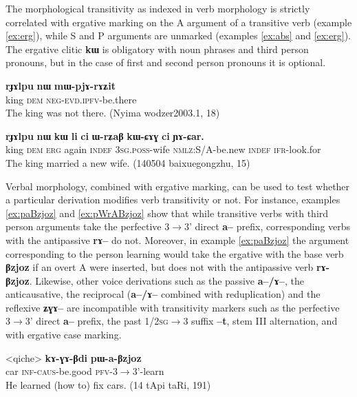 \documentclass[oldfontcommands,oneside,a4paper,11pt]{article}
\newcommand{\ipa}[1]{\textbf{{\phon\mbox{#1}}}} %
\begin{document}
The morphological transitivity as indexed in verb morphology is strictly correlated with ergative marking on the A argument of a transitive verb (example \ref{ex:erg}), while S and P arguments are unmarked (examples \ref{ex:abs} and \ref{ex:erg}). The ergative clitic \ipa{kɯ} is obligatory with noun phrases and third person pronouns, but in the case of first and second person pronouns it is optional.  

 \begin{exe}
\ex \label{ex:abs}
\gll
\ipa{rɟɤlpu}  	\ipa{nɯ}  	\ipa{mɯ-pjɤ-rɤʑit}  \\
king \textsc{dem} \textsc{neg-evd.ipfv}-be.there \\
 \glt The king was not there. (Nyima wodzer2003.1, 18)
\end{exe}

 \begin{exe}
\ex \label{ex:erg}
\gll 
\ipa{rɟɤlpu}  	\ipa{nɯ}  	\ipa{kɯ}  	\ipa{li}  	\ipa{ci}  	\ipa{ɯ-rʑaβ}  	\ipa{kɯ-ɕɤɣ}  	\ipa{ci}  	\ipa{ɲɤ-ɕar.}  	 \\
king \textsc{dem} \textsc{erg} again \textsc{indef} \textsc{3sg.poss}-wife \textsc{nmlz}:S/A-be.new \textsc{indef}  \textsc{ifr}-look.for \\
\glt The king married a new wife. (140504 baixuegongzhu, 15)
\end{exe}

Verbal morphology, combined with ergative marking, can be used to test whether a particular derivation modifies verb transitivity or not. For instance, examples \ref{ex:paBzjoz} and \ref{ex:pWrABzjoz} show that while transitive verbs with third person arguments take the perfective $3\rightarrow$3' direct \ipa{a--} prefix,  corresponding verbs with the antipassive \ipa{rɤ--} do not. Moreover, in example \ref{ex:paBzjoz} the argument corresponding to the person learning would take the ergative with the base verb \ipa{βzjoz} if an overt A were inserted, but does not with the antipassive verb \ipa{rɤ-βzjoz}. Likewise, other voice derivations such as the passive \ipa{a--/ɤ--}, the anticausative, the reciprocal (\ipa{a--/ɤ--} combined with reduplication) and the reflexive \ipa{ʑɣɤ--}  are incompatible with transitivity markers such as the perfective $3\rightarrow$3' direct \ipa{a--} prefix, the past \textsc{1/2sg}$\rightarrow$3 suffix \ipa{--t}, stem III alternation, and with ergative case marking.

 \begin{exe}
\ex \label{ex:paBzjoz}
\gll 
<qiche> 	\ipa{kɤ-ɣɤ-βdi} 	\ipa{pɯ-a-βzjoz} \\
car \textsc{inf-caus}-be.good \textsc{pfv}-3$\rightarrow$3'-learn \\
\glt He learned (how to) fix cars. (14 tApi taRi, 191)
\end{exe}
\end{document}
